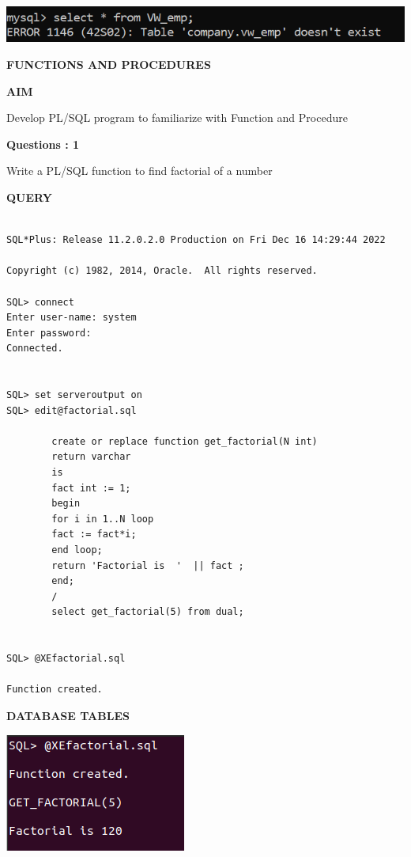 \documentclass[a4paper,12pt]{report}
\begin{document}
\includegraphics[scale=0.8]{Screenshot (481).png}
\newpage
\begin{center}
		\large\textbf{FUNCTIONS AND PROCEDURES}
	\end{center}
	
	\begin{flushleft}
		\textbf{AIM }
	\end{flushleft} 
	   Develop PL/SQL program to familiarize with Function and Procedure

\begin{flushleft}
    \textbf{Questions : 1}
\end{flushleft}
Write a PL/SQL function to find factorial of a number
	\begin{flushleft}
		\textbf{QUERY }
	\end{flushleft}
 \begin{verbatim}
 
SQL*Plus: Release 11.2.0.2.0 Production on Fri Dec 16 14:29:44 2022

Copyright (c) 1982, 2014, Oracle.  All rights reserved.

SQL> connect
Enter user-name: system
Enter password:
Connected.


SQL> set serveroutput on
SQL> edit@factorial.sql

		create or replace function get_factorial(N int)
		return varchar
		is
		fact int := 1;
		begin
		for i in 1..N loop
		fact := fact*i;
		end loop;
		return 'Factorial is  '  || fact ;
		end;
		/
		select get_factorial(5) from dual;


SQL> @XEfactorial.sql

Function created.

\end{verbatim}
\begin{flushleft}
		\textbf{DATABASE TABLES} 
\end{flushleft} 

\includegraphics[scale=0.7]{FACTORIAL.png}
\end{document}
